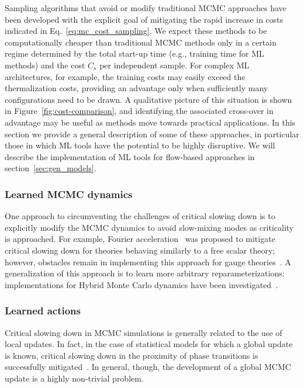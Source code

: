 \documentclass[12pt]{article}
\begin{document}
Sampling algorithms that avoid or modify traditional MCMC approaches have been developed with the explicit goal of mitigating the rapid increase in costs indicated in Eq.~\eqref{eq:mc_cost_sampling}.
We expect these methods to be computationally cheaper than traditional MCMC methods only in a certain regime determined by the total start-up time (e.g., training time for ML methods) and the cost $C_s$ per independent sample. For complex ML architectures, for example, the training costs may easily exceed the thermalization costs, providing an advantage only when sufficiently many configurations need to be drawn. A qualitative picture of this situation is shown in Figure~\ref{fig:cost-comparison}, and identifying the associated cross-over in advantage may be useful as methods move towards practical applications.
In this section we provide a general description of some of these approaches, in particular those in which ML tools have the potential to be highly disruptive. We will describe the implementation of ML tools for flow-based approaches in section~\ref{sec:gen_models}.

\subsubsection{Learned MCMC dynamics}
One approach to circumventing the challenges of critical slowing down is to explicitly modify the MCMC dynamics to avoid slow-mixing modes as criticality is approached. For example, Fourier acceleration~\cite{Batrouni:1985jn} was proposed to mitigate critical slowing down for theories behaving similarly to a free scalar theory; however, obstacles remain in implementing this approach for gauge theories~\cite{Davies:1987vs,Duane:1988vr}. A generalization of this approach is to learn more arbitrary reparameterizations: implementations for Hybrid Monte Carlo dynamics have been investigated~\cite{Levy:2017bji,Foreman:2021ixr,Foreman:2021rhs,Foreman:2023ymy}.

\subsubsection{Learned actions}

Critical slowing down in MCMC simulations is generally related to the use of local updates. In fact, in the case of statistical models for which a global update is known, critical slowing down in the proximity of phase transitions is successfully mitigated~\cite{Wolff:1988uh,Swendsen:1987ce}. In general, though, the development of a global MCMC update is a highly non-trivial problem.
\end{document}
